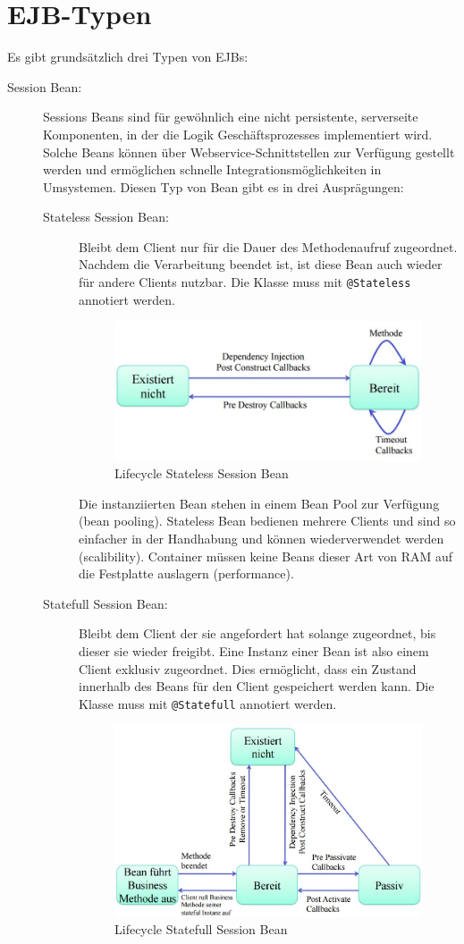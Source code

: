 \section{EJB-Typen}
Es gibt grundsätzlich drei Typen von EJBs:
\begin{description}
	\item[Session Bean:]
		Sessions Beans sind für gewöhnlich eine nicht persistente, serverseite Komponenten, in der die Logik Geschäftsprozesses implementiert wird. Solche Beans können über Webservice-Schnittstellen zur Verfügung gestellt werden und ermöglichen schnelle Integrationsmöglichkeiten in Umsystemen. Diesen Typ von Bean gibt es in drei Ausprägungen:
		\begin{description}
			\item[Stateless Session Bean:] Bleibt dem Client nur für die Dauer des Methodenaufruf zugeordnet. Nachdem die Verarbeitung beendet ist, ist diese Bean auch wieder für andere Clients nutzbar. Die Klasse muss mit \verb|@Stateless| annotiert werden.
			
			\begin{figure}[h!]
			\centering
			\includegraphics[width=0.5\linewidth]{fig/ejb-lifecycle-statless-bean}
			\caption{Lifecycle Stateless Session Bean}
			\label{fig:ejb-lifecycle-stateless-bean}
			\end{figure}
			
			Die instanziierten Bean stehen in einem Bean Pool zur Verfügung (bean pooling). Stateless Bean bedienen mehrere Clients und sind so einfacher in der Handhabung und können wiederverwendet werden (scalibility). Container müssen keine Beans dieser Art von RAM auf die Festplatte auslagern (performance).
			
			\item[Statefull Session Bean:] Bleibt dem Client der sie angefordert hat solange zugeordnet, bis dieser sie wieder freigibt. Eine Instanz einer Bean ist also einem Client exklusiv zugeordnet. Dies ermöglicht, dass ein Zustand innerhalb des Beans für den Client gespeichert werden kann. Die Klasse muss mit \verb|@Statefull| annotiert werden.
			
			\begin{figure}[h!]
			\centering
			\includegraphics[width=0.5\linewidth]{fig/ejb-lifecycle-statefull-bean}
			\caption{Lifecycle Statefull Session Bean}
			\label{fig:ejb-lifecycle-statefull-bean}
			\end{figure}
			

\end{description}
\end{description}
